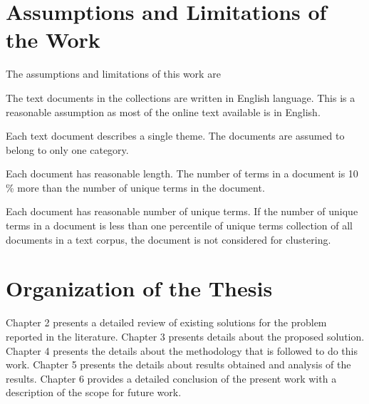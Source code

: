 \section{Assumptions and Limitations of the Work}
The assumptions and limitations of this work are 
\begin{inparaenum}
\item The text documents in the collections are written in English language. This is a reasonable assumption as most of the online text available is in English.
\item Each text document describes a single theme. The documents are assumed to belong to only one category.
\item Each document has reasonable length. The number of terms in a document is 10 \% more than the number of unique terms in the document.
\item Each document has reasonable number of unique terms. If the number of unique terms in a document is less than one percentile of unique terms collection of all documents in a text corpus, the document is not considered for clustering. 
\end{inparaenum}


\section{Organization of the Thesis}
Chapter 2 presents a detailed review of existing solutions for the problem reported in the literature.  Chapter 3 presents details about the proposed solution. Chapter 4 presents the details about the methodology that is followed to do this work. Chapter
5 presents the details about results obtained and analysis of the results. Chapter 6 provides a
detailed conclusion of the present work with a description of the scope for future work.
